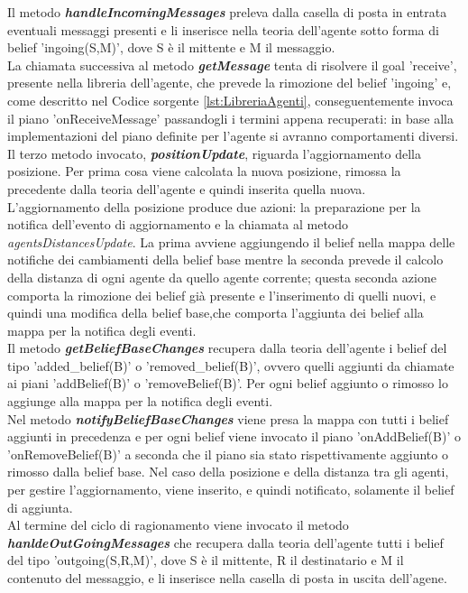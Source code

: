 \documentclass[12pt,a4paper,openright,twoside]{report}
\begin{document}
Il metodo \textbf{\textit{handleIncomingMessages}} preleva dalla casella di posta in entrata eventuali messaggi presenti e li inserisce nella teoria dell'agente sotto forma di belief 'ingoing(S,M)', dove S \`e il mittente e M il messaggio.
\\
La chiamata successiva al metodo \textbf{\textit{getMessage}} tenta di risolvere il goal 'receive', presente nella libreria dell'agente, che prevede la rimozione del belief 'ingoing' e, come descritto nel Codice sorgente \ref{lst:LibreriaAgenti}, conseguentemente invoca il piano 'onReceiveMessage' passandogli i termini appena recuperati: in base alla implementazioni del piano definite per l'agente si avranno comportamenti diversi.
\\
Il terzo metodo invocato, \textbf{\textit{positionUpdate}}, riguarda l'aggiornamento della posizione. Per prima cosa viene calcolata la nuova posizione, rimossa la precedente dalla teoria dell'agente e quindi inserita quella nuova. L'aggiornamento della posizione produce due azioni: la preparazione per la notifica dell'evento di aggiornamento e la chiamata al metodo \textit{agentsDistancesUpdate}. La prima avviene aggiungendo il belief nella mappa delle notifiche dei cambiamenti della belief base mentre la seconda prevede il calcolo della distanza di ogni agente da quello agente corrente; questa seconda azione comporta la rimozione dei belief gi\`a presente e l'inserimento di quelli nuovi, e quindi una modifica della belief base,che comporta l'aggiunta dei belief alla mappa per la notifica degli eventi.
\\
Il metodo \textbf{\textit{getBeliefBaseChanges}} recupera dalla teoria dell'agente i belief del tipo 'added\_belief(B)' o 'removed\_belief(B)', ovvero quelli aggiunti da chiamate ai piani 'addBelief(B)' o 'removeBelief(B)'. Per ogni belief aggiunto o rimosso lo aggiunge alla mappa per la notifica degli eventi.
\\
Nel metodo \textbf{\textit{notifyBeliefBaseChanges}} viene presa la mappa con tutti i belief aggiunti in precedenza e per ogni belief viene invocato il piano 'onAddBelief(B)' o 'onRemoveBelief(B)' a seconda che il piano sia stato rispettivamente aggiunto o rimosso dalla belief base. Nel caso della posizione e della distanza tra gli agenti, per gestire l'aggiornamento, viene inserito, e quindi notificato, solamente il belief di aggiunta.
\\
Al termine del ciclo di ragionamento viene invocato il metodo \textbf{\textit{hanldeOutGoingMessages}} che recupera dalla teoria dell'agente tutti i belief del tipo 'outgoing(S,R,M)', dove S \`e il mittente, R il destinatario e M il contenuto del messaggio, e li inserisce nella casella di posta in uscita dell'agene.
\end{document}
